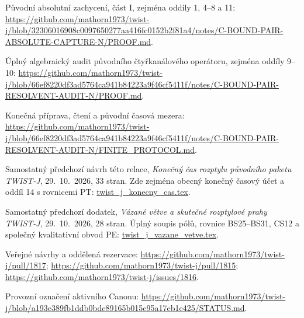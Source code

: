 \documentclass[11pt,a4paper]{article}
\theoremstyle{remark}\newtheorem{remark}[theorem]{Poznámka}
\numberwithin{equation}{section}
\begin{document}
\begin{description}[leftmargin=9mm,style=nextline]
\item[S1] Původní absolutní zachycení, část I, zejména
oddíly 1, 4--8 a 11:
\url{https://github.com/mathorn1973/twist-j/blob/32306016908c0097650277aa416fc0152b2f81a4/notes/C-BOUND-PAIR-ABSOLUTE-CAPTURE-N/PROOF.md}.
\item[S2] Úplný algebraický audit původního čtyřkanálového
operátoru, zejména oddíly 9--10:
\url{https://github.com/mathorn1973/twist-j/blob/66ef8220df3ad5764ca941b84223a9f46cf5411f/notes/C-BOUND-PAIR-RESOLVENT-AUDIT-N/PROOF.md}.
\item[S3] Konečná příprava, čtení a původní časová mezera:
\url{https://github.com/mathorn1973/twist-j/blob/66ef8220df3ad5764ca941b84223a9f46cf5411f/notes/C-BOUND-PAIR-RESOLVENT-AUDIT-N/FINITE_PROTOCOL.md}.
\item[S4] Samostatný předchozí návrh této relace,
\textit{Konečný čas rozptylu původního paketu TWIST-J},
29.~10.~2026, 33 stran. Zde zejména obecný konečný
časový účet a oddíl 14 s rovnicemi PT:
\url{twist_j_konecny_cas.tex}.
\item[S5] Samostatný předchozí dodatek,
\textit{Vázané větve a skutečné rozptylové prahy TWIST-J},
29.~10.~2026, 28 stran. Úplný soupis pólů, rovnice
BS25--BS31, CS12 a společný kvalitativní obvod PE:
\url{twist_j_vazane_vetve.tex}.
\item[S6] Veřejné návrhy a oddělená rezervace:
\url{https://github.com/mathorn1973/twist-j/pull/1817};
\url{https://github.com/mathorn1973/twist-j/pull/1815};
\url{https://github.com/mathorn1973/twist-j/issues/1816}.
\item[S7] Provozní označení aktivního Canonu:
\url{https://github.com/mathorn1973/twist-j/blob/a193e389fb1ddb0bdc89165b015c95a17eb1e425/STATUS.md}.
\end{description}
\end{document}

